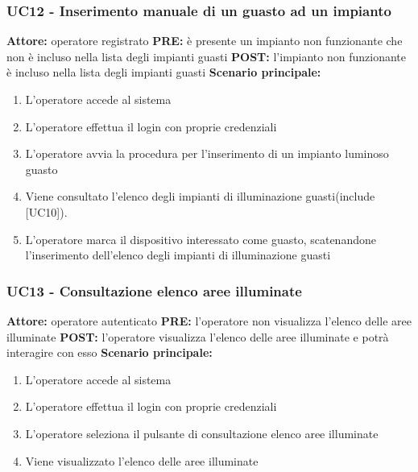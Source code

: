 \documentclass[a4paper, 12pt]{article}
\begin{document}
\subsubsection{UC12 - Inserimento manuale di un guasto ad un impianto}
\textbf{Attore:} operatore registrato\newline
\textbf{PRE:} è presente un impianto non funzionante che non è incluso nella lista degli impianti guasti\newline
\textbf{POST:} l'impianto non funzionante è incluso nella lista degli impianti guasti\newline
\textbf{Scenario principale:}
\begin{enumerate}
    \item L'operatore accede al sistema
    \item L'operatore effettua il login con proprie credenziali
    \item L'operatore avvia la procedura per l’inserimento di un impianto luminoso guasto
    \item Viene consultato l’elenco degli impianti di illuminazione guasti(include [UC10]).
    \item L'operatore marca il dispositivo interessato come guasto, scatenandone l’inserimento dell’elenco degli impianti di illuminazione guasti
\end{enumerate}

\subsubsection{UC13 - Consultazione elenco aree illuminate}
\textbf{Attore:} operatore autenticato\newline
\textbf{PRE:} l'operatore non visualizza l'elenco delle aree illuminate\newline
\textbf{POST:} l'operatore visualizza l'elenco delle aree illuminate e potrà interagire con esso\newline
\textbf{Scenario principale:}
\begin{enumerate}
    \item L'operatore accede al sistema
    \item L'operatore effettua il login con proprie credenziali
    \item L'operatore seleziona il pulsante di consultazione elenco aree illuminate
    \item Viene visualizzato l'elenco delle aree illuminate
\end{enumerate}
\end{document}
